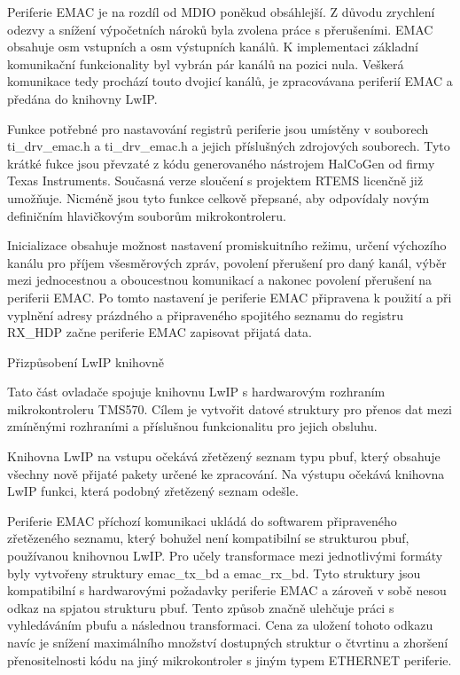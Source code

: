 Periferie EMAC je na rozdíl od MDIO poněkud obsáhlejší.
Z důvodu zrychlení odezvy a snížení výpočetních nároků byla zvolena práce s přerušeními.
EMAC obsahuje osm vstupních a osm výstupních kanálů.
K implementaci základní komunikační funkcionality byl vybrán pár kanálů na pozici nula.
Veškerá komunikace tedy prochází touto dvojicí kanálů, je zpracovávana periferií EMAC a předána do knihovny LwIP.

Funkce potřebné pro nastavování registrů periferie jsou umístěny v souborech ti\_drv\_emac.h a ti\_drv\_emac.h a jejich příslušných zdrojových souborech.
Tyto krátké fukce jsou převzaté z kódu generovaného nástrojem HalCoGen od firmy Texas Instruments.
Současná verze sloučení s projektem RTEMS licenčně již umožňuje.
Nicméně jsou tyto funkce celkově přepsané, aby odpovídaly novým definičním hlavičkovým souborům mikrokontroleru.

Inicializace obsahuje možnost nastavení promiskuitního režimu, určení výchozího kanálu pro příjem všesměrových zpráv, povolení přerušení pro daný kanál, výběr mezi jednocestnou a oboucestnou komunikací a nakonec povolení přerušení na periferii EMAC.
Po tomto nastavení je periferie EMAC připravena k použití a při vyplnění adresy prázdného a připraveného spojitého seznamu do registru RX\_HDP začne periferie EMAC zapisovat přijatá data.

\secc Přizpůsobení LwIP knihovně

Tato část ovladače spojuje knihovnu LwIP s hardwarovým rozhraním mikrokontroleru TMS570.
Cílem je vytvořit datové struktury pro přenos dat mezi zmíněnými rozhraními a příslušnou funkcionalitu pro jejich obsluhu.

Knihovna LwIP na vstupu očekává zřetězený seznam typu pbuf, který obsahuje všechny nově přijaté pakety určené ke zpracování.
Na výstupu očekává knihovna LwIP funkci, která podobný zřetězený seznam odešle.  

Periferie EMAC příchozí komunikaci ukládá do softwarem připraveného zřetězeného seznamu, který bohužel není kompatibilní se strukturou pbuf, používanou knihovnou LwIP.
Pro učely transformace mezi jednotlivými formáty byly vytvořeny struktury emac\_tx\_bd a emac\_rx\_bd.
Tyto struktury jsou kompatibilní s hardwarovými požadavky periferie EMAC a zároveň v sobě nesou odkaz na spjatou strukturu pbuf.
Tento způsob značně ulehčuje práci s vyhledáváním pbufu a následnou transformaci.
Cena za uložení tohoto odkazu navíc je snížení maximálního množství dostupných struktur o čtvrtinu a zhoršení přenositelnosti kódu na jiný mikrokontroler s jiným typem ETHERNET periferie.

